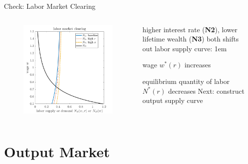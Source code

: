 \documentclass[11pt,aspectratio=43]{beamer}
\let\olditemize=\itemize
\let\endolditemize=\enditemize
\renewenvironment{itemize}{\olditemize \itemsep1em}{\endolditemize}
\theoremstyle{definition}
\begin{document}
\begin{frame}{Check: Labor Market Clearing}
\label{slide:Check__Labor_Market_Clearing}
    \begin{columns}
        \begin{column}{0.5\textwidth}
            \begin{figure}
                \includegraphics[width=\textwidth]{./figures/LaborMarketClear.png}
            \end{figure}
        \end{column}
        \begin{column}{0.5\textwidth}
            higher interest rate (\textbf{N2}), lower lifetime wealth (\textbf{N3}) both shifts out labor supply curve:
            \begin{itemize}
                \item wage $ w^{*}( r ) $ increases
                \item equilibrium quantity of labor $ N^{*}( r ) $ decreases
            \end{itemize}
            Next: construct output supply curve
        \end{column}
    \end{columns}
\end{frame}

\section{Output Market}
\label{sec:Output_Market}
\end{document}
